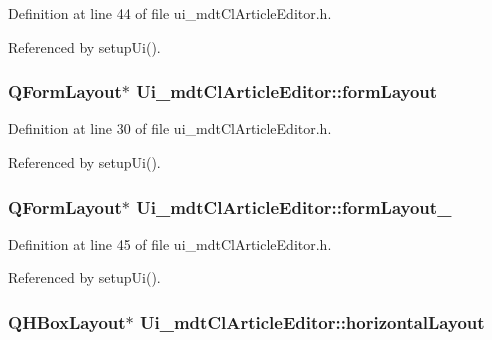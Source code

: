 Definition at line 44 of file ui\-\_\-mdt\-Cl\-Article\-Editor.\-h.



Referenced by setup\-Ui().

\hypertarget{class_ui__mdt_cl_article_editor_a5dbe124cf0740e1de3a8cca96a810433}{
\subsubsection[{form\-Layout}]{\setlength{\rightskip}{0pt plus 5cm}Q\-Form\-Layout$\ast$ Ui\-\_\-mdt\-Cl\-Article\-Editor\-::form\-Layout}}\label{class_ui__mdt_cl_article_editor_a5dbe124cf0740e1de3a8cca96a810433}


Definition at line 30 of file ui\-\_\-mdt\-Cl\-Article\-Editor.\-h.



Referenced by setup\-Ui().

\hypertarget{class_ui__mdt_cl_article_editor_a259a2c31f44e1446bf1ba9dcf5d103a2}{
\subsubsection[{form\-Layout\-\_\-2}]{\setlength{\rightskip}{0pt plus 5cm}Q\-Form\-Layout$\ast$ Ui\-\_\-mdt\-Cl\-Article\-Editor\-::form\-Layout\-\_}}\label{class_ui__mdt_cl_article_editor_a259a2c31f44e1446bf1ba9dcf5d103a2}


Definition at line 45 of file ui\-\_\-mdt\-Cl\-Article\-Editor.\-h.



Referenced by setup\-Ui().

\hypertarget{class_ui__mdt_cl_article_editor_ae870dcfff37aa5248b78f9a27eb3276c}{
\subsubsection[{horizontal\-Layout}]{\setlength{\rightskip}{0pt plus 5cm}Q\-H\-Box\-Layout$\ast$ Ui\-\_\-mdt\-Cl\-Article\-Editor\-::horizontal\-Layout}}\label{class_ui__mdt_cl_article_editor_ae870dcfff37aa5248b78f9a27eb3276c}


